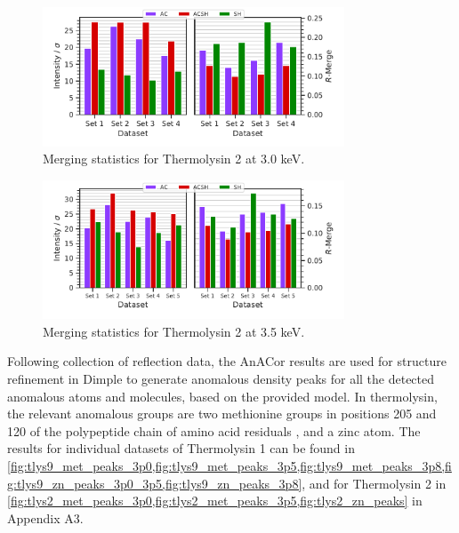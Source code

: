 \begin{figure}
    \centering
    \includegraphics[width = 0.8\textwidth]{plots/exp1/tlys_2_P6122/3p0_stats_grid.pdf}
    \caption{Merging statistics for Thermolysin 2 at 3.0 \unit{keV}.}
    \label{fig:tlys_2_3p0}
\end{figure}

\begin{figure}
    \centering
    \includegraphics[width = 0.8\textwidth]{plots/exp1/tlys_2_P6122/3p5_stats_grid.pdf}
    \caption{Merging statistics for Thermolysin 2 at 3.5 \unit{keV}.}
    \label{fig:tlys_2_3p5}
\end{figure}

Following collection of reflection data, the AnACor results are used for structure refinement in Dimple to generate anomalous density peaks for all the detected anomalous atoms and molecules, based on the provided model. In thermolysin, the relevant anomalous groups are two methionine groups in positions 205 and 120 of the polypeptide chain of amino acid residuals \cite{CLAUDIO1984}, and a zinc atom. The results for individual datasets of Thermolysin 1 can be found in \cref{fig:tlys9_met_peaks_3p0,fig:tlys9_met_peaks_3p5,fig:tlys9_met_peaks_3p8,fig:tlys9_zn_peaks_3p0_3p5,fig:tlys9_zn_peaks_3p8}, and for Thermolysin 2 in \cref{fig:tlys2_met_peaks_3p0,fig:tlys2_met_peaks_3p5,fig:tlys2_zn_peaks} in Appendix A3.%


